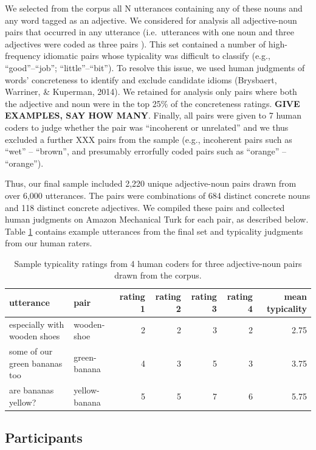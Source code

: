 \documentclass[10pt, letterpaper]{article}
\begin{document}
We selected from the corpus all N utterances containing any of these
nouns and any word tagged as an adjective. We considered for analysis
all adjective-noun pairs that occurred in any utterance (i.e.~utterances
with one noun and three adjectives were coded as three pairs ). This set
contained a number of high-frequency idiomatic pairs whose typicality
was difficult to classify (e.g., ``good''--``job'';
``little''--``bit''). To resolve this issue, we used human judgments of
words' concreteness to identify and exclude candidate idioms (Brysbaert,
Warriner, \& Kuperman, 2014). We retained for analysis only pairs where
both the adjective and noun were in the top 25\% of the concreteness
ratings. \textbf{GIVE EXAMPLES, SAY HOW MANY}. Finally, all pairs were
given to 7 human coders to judge whether the pair was ``incoherent or
unrelated'' and we thus excluded a further XXX pairs from the sample
(e.g., incoherent pairs such as ``wet'' -- ``brown'', and presumably
errorfully coded pairs such as ``orange'' -- ``orange'').

Thus, our final sample included 2,220 unique adjective-noun pairs drawn
from over 6,000 utterances. The pairs were combinations of 684 distinct
concrete nouns and 118 distinct concrete adjectives. We compiled these
pairs and collected human judgments on Amazon Mechanical Turk for each
pair, as described below. Table \ref{tab:utt_table} contains example
utterances from the final set and typicality judgments from our human
raters.

\begin{table}[tb]
\centering
\begin{tabular}{llrrrrr}
  \hline
utterance & pair & rating 1 & rating 2 & rating 3 & rating 4 & mean typicality \\ 
  \hline
especially with wooden shoes & wooden-shoe &   2 &   2 &   3 &   2 & 2.75 \\ 
  some of our green bananas too & green-banana &   4 &   3 &   5 &   3 & 3.75 \\ 
  are bananas yellow? & yellow-banana &   5 &   5 &   7 &   6 & 5.75 \\ 
   \hline
\end{tabular}
\caption{Sample typicality ratings from 4 human coders for three adjective-noun pairs drawn from the corpus.} 
\label{tab:utt_table}
\end{table}

\hypertarget{participants}{%
\subsection{Participants}\label{participants}}
\end{document}
